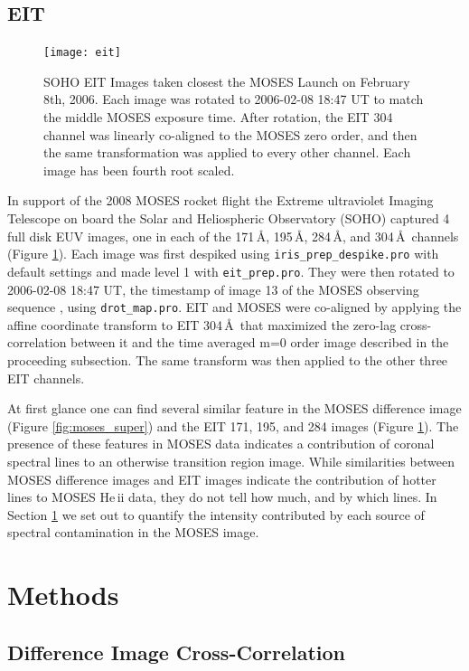 	\subsection{EIT}\label{sec:EIT_data}
		\begin{figure}
			\centering
			\texttt{[image: eit]}
			\caption{SOHO EIT Images taken closest the MOSES Launch on February 8th, 2006. Each image was rotated to 2006-02-08 18:47 UT to match the middle MOSES exposure time.  After rotation, the EIT 304 channel was linearly co-aligned to the MOSES zero order, and then the same transformation was applied to every other channel.  Each image has been fourth root scaled.}
			\label{fig:EIT}
		\end{figure}
	
		In support of the 2008 MOSES rocket flight the Extreme ultraviolet Imaging Telescope \citep[EIT:][]{EIT} on board the Solar and Heliospheric Observatory (SOHO) captured 4 full disk EUV images, one in each of the 171\,\AA, 195\,\AA, 284\,\AA, and 304\,\AA\ channels (Figure \ref{fig:EIT}). 
		Each image was first despiked using \texttt{iris\_prep\_despike.pro} with default settings and made level 1 with \texttt{eit\_prep.pro}. 
		They were then rotated to 2006-02-08 18:47 UT, the timestamp of image 13 of the MOSES observing sequence \citep{Fox2011}, using \texttt{drot\_map.pro}.
		EIT and MOSES were co-aligned by applying the affine coordinate transform to EIT 304\,\AA\ that maximized the zero-lag cross-correlation between it and the time averaged m=0 order image described in the proceeding subsection.
		The same transform was then applied to the other three EIT channels.
	 
		At first glance one can find several similar feature in the MOSES difference image (Figure \ref{fig:moses_super}) and the EIT 171, 195, and 284 images (Figure \ref{fig:EIT}).  
		The presence of these features in MOSES data indicates a contribution of coronal spectral lines to an otherwise transition region image.  
		While similarities between MOSES difference images and EIT images indicate the contribution of hotter lines to MOSES He\,{\sc ii} data, they do not tell how much, and by which lines.  
		In Section \ref{sec:methods} we set out to quantify the intensity contributed by each source of spectral contamination in the MOSES image.
		
		
\section{Methods}\label{sec:methods}
 	\subsection{Difference Image Cross-Correlation}\label{sec:crosscorrelation}
 	
